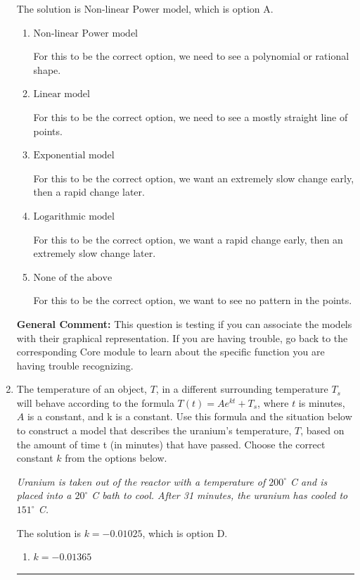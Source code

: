 \documentclass{extbook}[14pt]
\newcommand{\litem}[1]{\item #1

\rule{\textwidth}{0.4pt}}
\begin{document}
\begin{enumerate}
{The solution is \( \text{Non-linear Power model} \), which is option A.\begin{enumerate}[label=\Alph*.]
\item \( \text{Non-linear Power model} \)

For this to be the correct option, we need to see a polynomial or rational shape.
\item \( \text{Linear model} \)

For this to be the correct option, we need to see a mostly straight line of points.
\item \( \text{Exponential model} \)

For this to be the correct option, we want an extremely slow change early, then a rapid change later.
\item \( \text{Logarithmic model} \)

For this to be the correct option, we want a rapid change early, then an extremely slow change later.
\item \( \text{None of the above} \)

For this to be the correct option, we want to see no pattern in the points.
\end{enumerate}

\textbf{General Comment:} This question is testing if you can associate the models with their graphical representation. If you are having trouble, go back to the corresponding Core module to learn about the specific function you are having trouble recognizing.
}
\litem{
The temperature of an object, $T$, in a different surrounding temperature $T_s$ will behave according to the formula $T(t) = Ae^{kt} + T_s$, where $t$ is minutes, $A$ is a constant, and k is a constant. Use this formula and the situation below to construct a model that describes the uranium's temperature, $T$, based on the amount of time t (in minutes) that have passed. Choose the correct constant $k$ from the options below.

\begin{center}
    \textit{ Uranium is taken out of the reactor with a temperature of $200^{\circ}$ C and is placed into a $20^{\circ}$ C bath to cool. After 31 minutes, the uranium has cooled to $151^{\circ}$ C. }
\end{center}


The solution is \( k = -0.01025 \), which is option D.\begin{enumerate}[label=\Alph*.]
\item \( k = -0.01365 \)


\end{enumerate}}
\end{enumerate}
\end{document}
